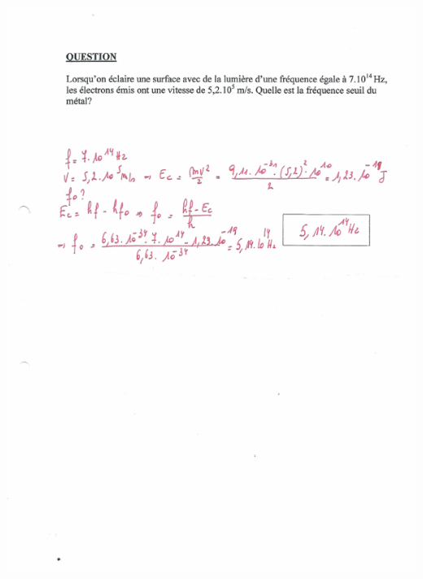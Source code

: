 {{{\includegraphics[width=17.498cm,height=24.13cm]{Pictures/10000001000002570000033B282FC06DC4D6D42C.png}

}}}
